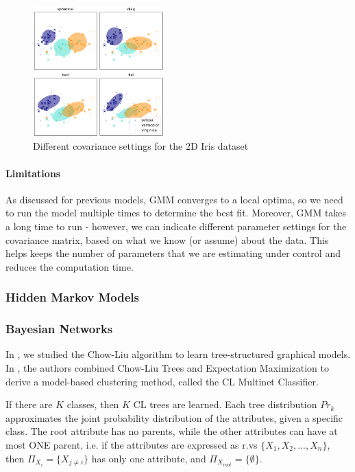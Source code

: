 \begin{figure}[h]
    \centering
    \includegraphics[width = 0.45\textwidth]{Figures/Covar.png}
    \caption{Different covariance settings for the 2D Iris dataset}
    \label{fig:Covariance}
\end{figure}
\paragraph{Limitations}
As discussed for previous models, GMM converges to a local optima, so we need to run the model multiple times to determine the best fit. Moreover, GMM takes a long time to run - however, we can indicate different parameter settings for the covariance matrix, based on what we know (or assume) about the data. This helps keeps the number of parameters that we are estimating under control and reduces the computation time.

\subsubsection{Hidden Markov Models}

\subsubsection{Bayesian Networks}

In \cite{TanVYF}, we studied the Chow-Liu algorithm to learn  tree-structured graphical models. In \cite{pham2009unsupervised}, the authors combined Chow-Liu Trees and Expectation Maximization to derive a model-based clustering method, called the CL Multinet Classifier.

If there are $K$ classes, then $K$ CL trees are learned. Each tree distribution $Pr_k$ approximates the joint probability distribution of the attributes, given a specific class. The root attribute has no parents, while the other attributes can have at most ONE parent, i.e. if the attributes are expressed as r.vs $\{X_1, X_2,...,X_n\}$, then $\Pi_{X_i} = \{X_{j \neq i}\}$ has only one attribute, and $\Pi_{X_{root}} = \{\emptyset\}$. 
 
